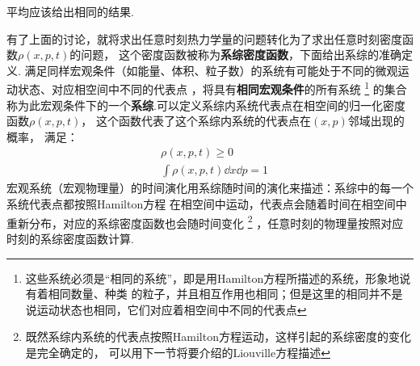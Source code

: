     平均应该给出相同的结果.
    \par 
    有了上面的讨论，就将求出任意时刻热力学量的问题转化为了求出任意时刻密度函数$\rho(x, p, t)$的问题，
    这个密度函数被称为\textbf{系综密度函数}，下面给出系综的准确定义.
    满足同样宏观条件（如能量、体积、粒子数）的系统有可能处于不同的微观运动状态、对应相空间中不同的代表点
    ，将具有\textbf{相同宏观条件}的所有系统
    \footnote{这些系统必须是“相同的系统”，即是用Hamilton方程所描述的系统，形象地说有着相同数量、种类
    的粒子，并且相互作用也相同；但是这里的相同并不是说运动状态也相同，它们对应着相空间中不同的代表点
    }
    的集合称为此宏观条件下的一个\textbf{系综}.可以定义系综内系统代表点在相空间的归一化密度函数$\rho(x, p, t)$，
    这个函数代表了这个系综内系统的代表点在$(x, p)$邻域出现的概率，
    满足：
    \begin{equation}
        \begin{split}
            &\rho(x, p, t) \geq 0\\
            &\int\rho(x, p, t)\dd x\dd p = 1
        \end{split}
        \label{ensemble density}
    \end{equation}
    宏观系统（宏观物理量）的时间演化用系综随时间的演化来描述：系综中的每一个系统代表点都按照Hamilton方程
    在相空间中运动，代表点会随着时间在相空间中重新分布，对应的系综密度函数也会随时间变化
    \footnote{既然系综内系统的代表点按照Hamilton方程运动，这样引起的系综密度的变化是完全确定的，
    可以用下一节将要介绍的Liouville方程描述}
    ，任意时刻的物理量按照对应时刻的系综密度函数计算.
